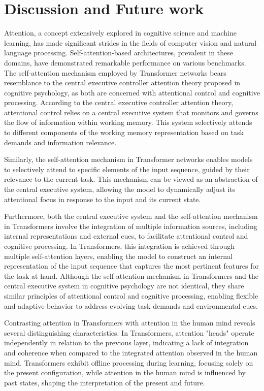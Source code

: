 \chapter{Discussion and Future work}

\startcontents[chapters]

Attention, a concept extensively explored in cognitive science and machine learning, has made significant strides in the fields of computer vision and natural language processing. Self-attention-based architectures, prevalent in these domains, have demonstrated remarkable performance on various benchmarks. The self-attention mechanism employed by Transformer networks bears resemblance to the central executive controller attention theory proposed in cognitive psychology, as both are concerned with attentional control and cognitive processing. According to the central executive controller attention theory, attentional control relies on a central executive system that monitors and governs the flow of information within working memory. This system selectively attends to different components of the working memory representation based on task demands and information relevance.

Similarly, the self-attention mechanism in Transformer networks enables models to selectively attend to specific elements of the input sequence, guided by their relevance to the current task. This mechanism can be viewed as an abstraction of the central executive system, allowing the model to dynamically adjust its attentional focus in response to the input and its current state.

Furthermore, both the central executive system and the self-attention mechanism in Transformers involve the integration of multiple information sources, including internal representations and external cues, to facilitate attentional control and cognitive processing. In Transformers, this integration is achieved through multiple self-attention layers, enabling the model to construct an internal representation of the input sequence that captures the most pertinent features for the task at hand. Although the self-attention mechanism in Transformers and the central executive system in cognitive psychology are not identical, they share similar principles of attentional control and cognitive processing, enabling flexible and adaptive behavior to address evolving task demands and environmental cues.

Contrasting attention in Transformers with attention in the human mind reveals several distinguishing characteristics. In Transformers, attention "heads" operate independently in relation to the previous layer, indicating a lack of integration and coherence when compared to the integrated attention observed in the human mind. Transformers exhibit offline processing during learning, focusing solely on the present configuration, while attention in the human mind is influenced by past states, shaping the interpretation of the present and future.

